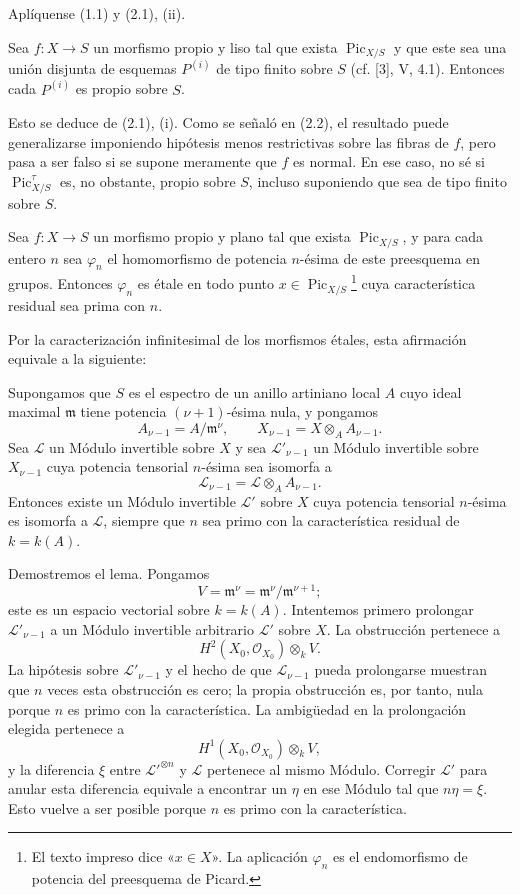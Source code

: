 Aplíquense (1.1) y (2.1), (ii).

 Sea $f:X\longrightarrow S$ un morfismo propio y liso
tal que exista $\operatorname{Pic}_{X/S}$ y que este sea una unión disjunta de
esquemas $P^{(i)}$ de tipo finito sobre $S$ (cf. [3], V, 4.1). Entonces cada
$P^{(i)}$ es propio sobre $S$.

Esto se deduce de (2.1), (i). Como se señaló en (2.2), el resultado puede
generalizarse imponiendo hipótesis menos restrictivas sobre las fibras de $f$,
pero pasa a ser falso si se supone meramente que $f$ es normal. En ese caso,
no sé si $\operatorname{Pic}_{X/S}^\tau$ es, no obstante, propio sobre $S$,
incluso suponiendo que sea de tipo finito sobre $S$.

 Sea $f:X\longrightarrow S$ un morfismo propio y plano tal
que exista $\operatorname{Pic}_{X/S}$, y para cada entero $n$ sea $\varphi_n$
el homomorfismo de potencia $n$-ésima de este preesquema en grupos. Entonces
$\varphi_n$ es étale en todo punto
$x\in\operatorname{Pic}_{X/S}$\footnote{El texto impreso dice «$x\in X$». La
aplicación $\varphi_n$ es el endomorfismo de potencia del preesquema de
Picard.} cuya característica residual sea prima con $n$.

Por la caracterización infinitesimal de los morfismos étales, esta afirmación
equivale a la siguiente:

 Supongamos que $S$ es el espectro de un anillo artiniano
local $A$ cuyo ideal maximal $\mathfrak m$ tiene potencia $(\nu+1)$-ésima nula,
y pongamos
\[
A_{\nu-1}=A/\mathfrak m^\nu,
\qquad X_{\nu-1}=X\otimes_A A_{\nu-1}.
\]
Sea $\mathcal L$ un Módulo invertible sobre $X$ y sea
$\mathcal L'_{\nu-1}$ un Módulo invertible sobre $X_{\nu-1}$ cuya potencia
tensorial $n$-ésima sea isomorfa a
\[
\mathcal L_{\nu-1}=\mathcal L\otimes_A A_{\nu-1}.
\]
Entonces existe un Módulo invertible $\mathcal L'$ sobre $X$ cuya potencia
tensorial $n$-ésima es isomorfa a $\mathcal L$, siempre que $n$ sea primo con
la característica residual de $k=k(A)$.

Demostremos el lema. Pongamos
\[
V=\mathfrak m^\nu=\mathfrak m^\nu/\mathfrak m^{\nu+1};
\]
este es un espacio vectorial sobre $k=k(A)$. Intentemos primero prolongar
$\mathcal L'_{\nu-1}$ a un Módulo invertible arbitrario $\mathcal L'$ sobre $X$.
La obstrucción pertenece a
\[
H^2(X_0,\mathcal O_{X_0})\otimes_k V.
\]
La hipótesis sobre $\mathcal L'_{\nu-1}$ y el hecho de que
$\mathcal L_{\nu-1}$ pueda prolongarse muestran que $n$ veces esta obstrucción
es cero; la propia obstrucción es, por tanto, nula porque $n$ es primo con la
característica. La ambigüedad en la prolongación elegida pertenece a
\[
H^1(X_0,\mathcal O_{X_0})\otimes_k V,
\]
y la diferencia $\xi$ entre $\mathcal L'^{\otimes n}$ y $\mathcal L$ pertenece
al mismo Módulo. Corregir $\mathcal L'$ para anular esta diferencia equivale a
encontrar un $\eta$ en ese Módulo tal que $n\eta=\xi$. Esto vuelve a ser
posible porque $n$ es primo con la característica.

